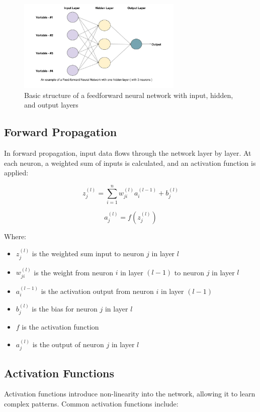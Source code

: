 \documentclass[11pt,a4paper]{report}
\begin{document}
\begin{figure}[ht]
    \centering
    \includegraphics[width=0.7\textwidth]{neural_network_basic_structure.jpg}
    \caption{Basic structure of a feedforward neural network with input, hidden, and output layers}
    \label{fig:nn-structure}
\end{figure}

\subsection{Forward Propagation}
In forward propagation, input data flows through the network layer by layer. At each neuron, a weighted sum of inputs is calculated, and an activation function is applied:

\begin{equation}
z_j^{(l)} = \sum_{i=1}^{n} w_{ji}^{(l)} a_i^{(l-1)} + b_j^{(l)}
\end{equation}

\begin{equation}
a_j^{(l)} = f(z_j^{(l)})
\end{equation}

Where:
\begin{itemize}
    \item $z_j^{(l)}$ is the weighted sum input to neuron $j$ in layer $l$
    \item $w_{ji}^{(l)}$ is the weight from neuron $i$ in layer $(l-1)$ to neuron $j$ in layer $l$
    \item $a_i^{(l-1)}$ is the activation output from neuron $i$ in layer $(l-1)$
    \item $b_j^{(l)}$ is the bias for neuron $j$ in layer $l$
    \item $f$ is the activation function
    \item $a_j^{(l)}$ is the output of neuron $j$ in layer $l$
\end{itemize}

\subsection{Activation Functions}
Activation functions introduce non-linearity into the network, allowing it to learn complex patterns. Common activation functions include:
\end{document}
